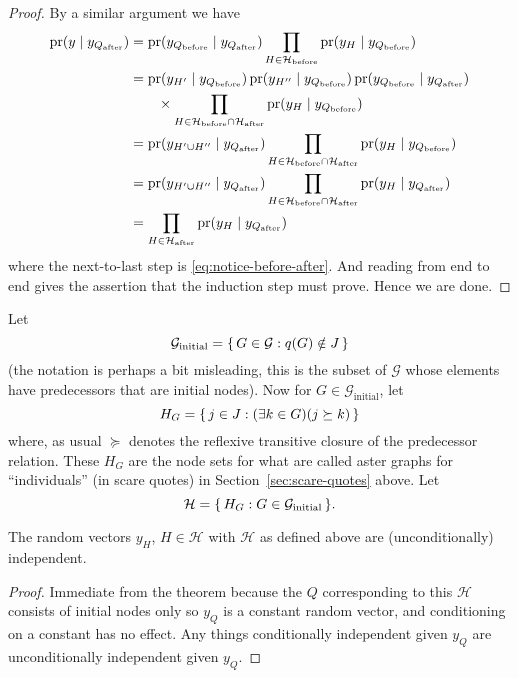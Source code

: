 \begin{proof}
By a similar argument we have
\begin{align*}
   \operatorname{pr}(y \mid  y_{Q_\text{after}})
   & =
   \operatorname{pr}(y_{Q_\text{before}} \mid y_{Q_\text{after}})
   \prod_{H \in \mathcal{H}_\text{before}}
   \operatorname{pr}(y_H \mid y_{Q_\text{before}})
   \\
   & =
   \operatorname{pr}(y_{H'} \mid y_{Q_\text{before}})
   \operatorname{pr}(y_{H''} \mid y_{Q_\text{before}})
   \operatorname{pr}(y_{Q_\text{before}} \mid y_{Q_\text{after}})
   \\
   & \qquad
   \times
   \prod_{H \in \mathcal{H}_\text{before} \cap \mathcal{H}_\text{after}}
   \operatorname{pr}(y_H \mid y_{Q_\text{before}})
   \\
   & =
   \operatorname{pr}(y_{H' \cup H''} \mid  y_{Q_\text{after}})
   \prod_{H \in \mathcal{H}_\text{before} \cap \mathcal{H}_\text{after}}
   \operatorname{pr}(y_H \mid y_{Q_\text{before}})
   \\
   & =
   \operatorname{pr}(y_{H' \cup H''} \mid  y_{Q_\text{after}})
   \prod_{H \in \mathcal{H}_\text{before} \cap \mathcal{H}_\text{after}}
   \operatorname{pr}(y_H \mid y_{Q_\text{after}})
   \\
   & =
   \prod_{H \in \mathcal{H}_\text{after}}
   \operatorname{pr}(y_H \mid y_{Q_\text{after}})
\end{align*}
where the next-to-last step is \eqref{eq:notice-before-after}.
And reading from end to end gives the assertion that the induction step
must prove.  Hence we are done.
\end{proof}

Let
$$
   \mathcal{G}_\text{initial}
   =
   \{\,  G \in \mathcal{G} : q(G) \notin J  \,\}
$$
(the notation is perhaps a bit misleading, this is the subset of $\mathcal{G}$
whose elements have predecessors that are initial nodes).
Now for $G \in \mathcal{G}_\text{initial}$, let
$$
   H_G = \{\,  j \in J : (\exists k \in G)(j \succeq k)  \,\}
$$
where, as usual $\succeq$ denotes the reflexive transitive closure of the
predecessor relation.  These $H_G$ are the node sets for what are called
aster graphs for ``individuals'' (in scare quotes)
in Section~\ref{sec:scare-quotes} above.
Let
$$
   \mathcal{H} = \{\,  H_G : G \in \mathcal{G}_\text{initial}  \,\}.
$$

\begin{corollary} \label{cor:markov}
The random vectors $y_H$, $H \in \mathcal{H}$ with $\mathcal{H}$ as
defined above are (unconditionally) independent.
\end{corollary}
\begin{proof}
Immediate from the theorem because the $Q$ corresponding to this $\mathcal{H}$
consists of initial nodes only so $y_Q$ is a constant random vector, and
conditioning on a constant has no effect.  Any things conditionally independent
given $y_Q$ are unconditionally independent given $y_Q$.
\end{proof}


